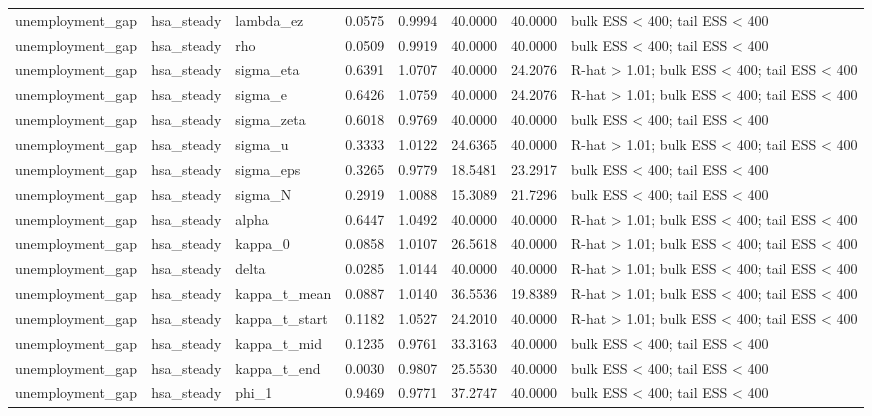 \begin{tabular}{lllrrrrl}
unemployment\_gap & hsa\_steady & lambda\_ez & 0.0575 & 0.9994 & 40.0000 & 40.0000 & bulk ESS < 400; tail ESS < 400 \\
unemployment\_gap & hsa\_steady & rho & 0.0509 & 0.9919 & 40.0000 & 40.0000 & bulk ESS < 400; tail ESS < 400 \\
unemployment\_gap & hsa\_steady & sigma\_eta & 0.6391 & 1.0707 & 40.0000 & 24.2076 & R-hat > 1.01; bulk ESS < 400; tail ESS < 400 \\
unemployment\_gap & hsa\_steady & sigma\_e & 0.6426 & 1.0759 & 40.0000 & 24.2076 & R-hat > 1.01; bulk ESS < 400; tail ESS < 400 \\
unemployment\_gap & hsa\_steady & sigma\_zeta & 0.6018 & 0.9769 & 40.0000 & 40.0000 & bulk ESS < 400; tail ESS < 400 \\
unemployment\_gap & hsa\_steady & sigma\_u & 0.3333 & 1.0122 & 24.6365 & 40.0000 & R-hat > 1.01; bulk ESS < 400; tail ESS < 400 \\
unemployment\_gap & hsa\_steady & sigma\_eps & 0.3265 & 0.9779 & 18.5481 & 23.2917 & bulk ESS < 400; tail ESS < 400 \\
unemployment\_gap & hsa\_steady & sigma\_N & 0.2919 & 1.0088 & 15.3089 & 21.7296 & bulk ESS < 400; tail ESS < 400 \\
unemployment\_gap & hsa\_steady & alpha & 0.6447 & 1.0492 & 40.0000 & 40.0000 & R-hat > 1.01; bulk ESS < 400; tail ESS < 400 \\
unemployment\_gap & hsa\_steady & kappa\_0 & 0.0858 & 1.0107 & 26.5618 & 40.0000 & R-hat > 1.01; bulk ESS < 400; tail ESS < 400 \\
unemployment\_gap & hsa\_steady & delta & 0.0285 & 1.0144 & 40.0000 & 40.0000 & R-hat > 1.01; bulk ESS < 400; tail ESS < 400 \\
unemployment\_gap & hsa\_steady & kappa\_t\_mean & 0.0887 & 1.0140 & 36.5536 & 19.8389 & R-hat > 1.01; bulk ESS < 400; tail ESS < 400 \\
unemployment\_gap & hsa\_steady & kappa\_t\_start & 0.1182 & 1.0527 & 24.2010 & 40.0000 & R-hat > 1.01; bulk ESS < 400; tail ESS < 400 \\
unemployment\_gap & hsa\_steady & kappa\_t\_mid & 0.1235 & 0.9761 & 33.3163 & 40.0000 & bulk ESS < 400; tail ESS < 400 \\
unemployment\_gap & hsa\_steady & kappa\_t\_end & 0.0030 & 0.9807 & 25.5530 & 40.0000 & bulk ESS < 400; tail ESS < 400 \\
unemployment\_gap & hsa\_steady & phi\_1 & 0.9469 & 0.9771 & 37.2747 & 40.0000 & bulk ESS < 400; tail ESS < 400 \\

\end{tabular}
